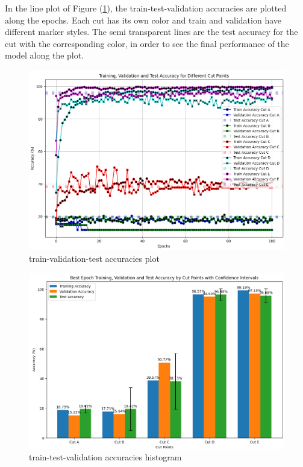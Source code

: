 \documentclass[11pt]{scrartcl}
\begin{document}
In the line plot of Figure (\ref{fig:task3-bonus-plot}),
the train-test-validation accuracies are plotted along the epochs.
Each cut has its own color and train and validation have different marker styles.
The semi transparent lines are the test accuracy for the cut with the corresponding color,
in order to see the final performance of the model along the plot.

\begin{figure}[htbp]
	\centering
	\includegraphics[width=0.8\paperwidth, trim={3.5cm 0cm 0cm 0cm}]{task3-bonus-plot.png}
	\caption{train-validation-test accuracies plot}
	\label{fig:task3-bonus-plot}
\end{figure}

\begin{figure}[htbp]
	\centering
	\includegraphics[width=\textwidth]{task3-bonus-histogram.png}
	\caption{train-test-validation accuracies histogram}
	\label{fig:task3-bonus-histogram}
\end{figure}
\end{document}
